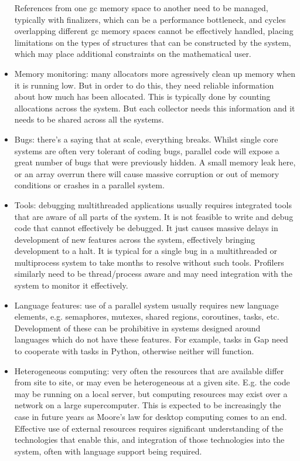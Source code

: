 \documentclass{deliverablereport}
\begin{document}
\begin{itemize}
  References from one gc memory space to another need to be managed, typically with finalizers, which can
  be a performance bottleneck, and cycles overlapping different gc memory spaces cannot be effectively handled,
  placing limitations on the types of structures that can be constructed by the system, which may place
  additional constraints on the mathematical user.

\item Memory monitoring: many allocators more agressively clean up memory when it is running low. But in
  order to do this, they need reliable information about how much has been allocated. This is typically done
  by counting allocations across the system. But each collector needs this information and it needs to be
  shared across all the systems. 

\item Bugs: there's a saying that at scale, everything breaks. Whilst single core systems are often very
  tolerant of coding bugs, parallel code will expose a great number of bugs that were previously hidden. A
  small memory leak here, or an array overrun there will cause massive corruption or out of memory conditions
  or crashes in a parallel system.

\item Tools: debugging multithreaded applications usually requires integrated tools that are aware of all
  parts of the system. It is not feasible to write and debug code that cannot effectively be debugged. It
  just causes massive delays in development of new features across the system, effectively bringing
  development to a halt. It is typical for a single bug in a multithreaded or multiprocess system to take
  months to resolve without such tools. Profilers similarly need to be thread/process aware and may need
  integration with the system to monitor it effectively.

\item Language features: use of a parallel system usually requires new language elements, e.g. semaphores,
  mutexes, shared regions, coroutines, tasks, etc. Development of these can be prohibitive in systems designed
  around languages which do not have these features. For example, tasks in Gap need to cooperate with tasks in
  Python, otherwise neither will function.

\item Heterogeneous computing: very often the resources that are available differ from site to site, or may
  even be heterogeneous at a given site. E.g. the code may be running on a local server, but computing
  resources may exist over a network on a large supercomputer. This is expected to be increasingly the case in
  future years as Moore's law for desktop computing comes to an end. Effective use of external resources
  requires significant understanding of the technologies that enable this, and integration of those
  technologies into the system, often with language support being required.


\end{itemize}
\end{document}
